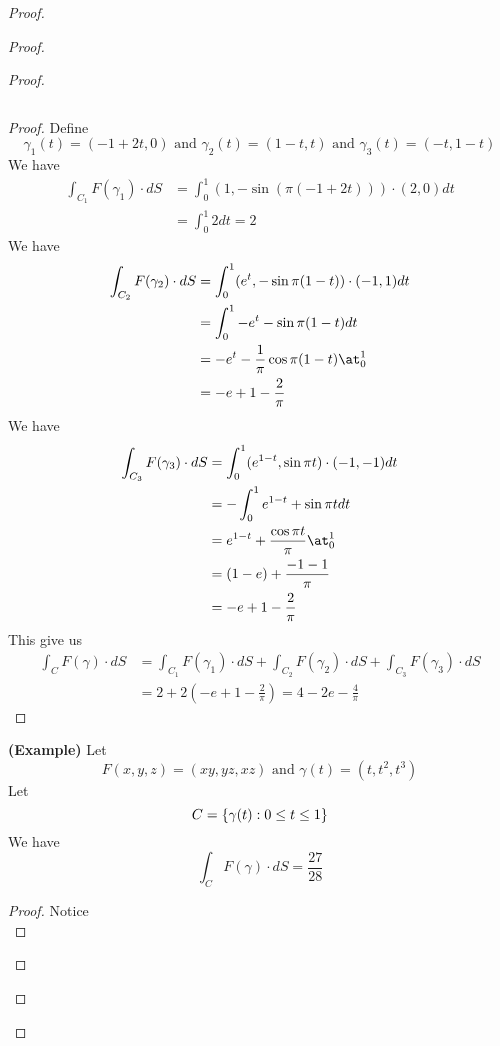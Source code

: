 \documentclass{report}
\begin{document}
\begin{proof}
\begin{proof}
\begin{proof}
\begin{theorem}
\begin{equation}
\end{equation}
\end{theorem}
\begin{proof}
Define
\begin{equation}
\gamma_1 (t)=(-1+2t,0)\text{ and }\gamma_2 (t)=(1-t,t)\text{ and }\gamma _3(t)=(-t,1-t)
\end{equation}
We have
\begin{align}
\int_{C_1}F(\gamma _1)\cdot dS&= \int_0^1 (1,- \sin (\pi (-1+2t)))\cdot (2,0) dt\\
&=\int_0^1 2dt=2
\end{align}
We have
\begin{align}
\int_{C_2}F(\gamma _2)\cdot dS&= \int_0^1 (e^t,- \sin \pi (1-t))\cdot (-1,1)dt\\
&=\int_0^1 -e^t- \sin \pi (1-t)dt\\
&=-e^t-\frac{1}{\pi} \cos \pi (1-t)\at_{0}^1\\
&=-e+1-\frac{2}{\pi}
\end{align}
We have
\begin{align}
\int_{C_3} F(\gamma _3)\cdot dS&=\int_0^1 (e^{1-t}, \sin \pi t)\cdot (-1,-1)dt\\
&=-\int_0^1 e^{1-t}+\sin \pi tdt\\
&= e^{1-t}+\frac{\cos \pi t}{\pi }\at_{0}^1\\
&=(1-e)+\frac{-1-1}{\pi}\\
&=-e+1-\frac{2}{\pi}
\end{align}
This give us
\begin{align}
\int_C F(\gamma )\cdot dS&= \int_{C_1}F(\gamma _1)\cdot dS+\int_{C_2}F(\gamma _2)\cdot dS+\int_{C_3}F(\gamma _3)\cdot dS\\
&=2+2(-e+1-\frac{2}{\pi})=4-2e-\frac{4}{\pi}
\end{align}
\end{proof}
\begin{theorem}
\label{7.1.10}
\textbf{(Example)} Let
\begin{equation}
F(x,y,z)=(xy,yz,xz)\text{ and }\gamma (t)=(t,t^2,t^3)
\end{equation}
Let 
\begin{equation}
C=\{ \gamma (t):0\leq t\leq 1 \}
\end{equation}
We have
\begin{equation}
\int_C F(\gamma )\cdot dS=\frac{27}{28}
\end{equation}
\end{theorem}
\begin{proof}
Notice 
\begin{equation}

\end{equation}
\end{proof}
\end{proof}
\end{proof}
\end{proof}
\end{document}
